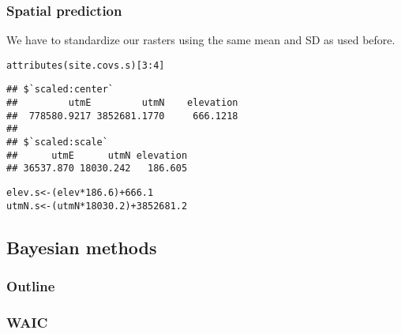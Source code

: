 \documentclass[color=usenames,dvipsnames]{beamer}\usepackage[]{graphicx}\usepackage[]{color}
\makeatletter
\newcommand{\hlnum}[1]{\textcolor[rgb]{0.69,0.494,0}{#1}}%
\newcommand{\hlopt}[1]{\textcolor[rgb]{0,0,0}{#1}}%
\newcommand{\hlstd}[1]{\textcolor[rgb]{0,0,0}{#1}}%
\newcommand{\hlkwb}[1]{\textcolor[rgb]{0,0.341,0.682}{#1}}%
\newcommand{\hlkwd}[1]{\textcolor[rgb]{0.004,0.004,0.506}{#1}}%
\newenvironment{kframe}{%
 \def\at@end@of@kframe{}%
 \ifinner\ifhmode%
  \def\at@end@of@kframe{\end{minipage}}%
  \begin{minipage}{\columnwidth}%
 \fi\fi%
 \def\FrameCommand##1{\hskip\@totalleftmargin \hskip-\fboxsep
 \colorbox{shadecolor}{##1}\hskip-\fboxsep
     \hskip-\linewidth \hskip-\@totalleftmargin \hskip\columnwidth}%
 \MakeFramed {\advance\hsize-\width
   \@totalleftmargin\z@ \linewidth\hsize
   \@setminipage}}%
 {\par\unskip\endMakeFramed%
 \at@end@of@kframe}
\newenvironment{knitrout}{}{} %
\makeatother
\begin{document}
\begin{frame}[fragile]
  \frametitle{Spatial prediction}
  We have to standardize our rasters \alert{using the same mean and SD as used before}.
\begin{knitrout}\scriptsize
{}\color{fgcolor}\begin{kframe}
\begin{alltt}
\hlkwd{attributes}\hlstd{(site.covs.s)[}\hlnum{3}\hlopt{:}\hlnum{4}\hlstd{]}
\end{alltt}
\begin{verbatim}
## $`scaled:center`
##         utmE         utmN    elevation 
##  778580.9217 3852681.1770     666.1218 
## 
## $`scaled:scale`
##      utmE      utmN elevation 
## 36537.870 18030.242   186.605
\end{verbatim}
\end{kframe}
\end{knitrout}
\pause
\vfill
\begin{knitrout}
\color{fgcolor}\begin{kframe}
\begin{alltt}
\hlstd{elev.s} \hlkwb{<-} \hlstd{(elev}\hlopt{*}\hlnum{186.6}\hlstd{)}\hlopt{+}\hlnum{666.1}
\hlstd{utmN.s} \hlkwb{<-} \hlstd{(utmN}\hlopt{*}\hlnum{18030.2}\hlstd{)}\hlopt{+}\hlnum{3852681.2}
\end{alltt}
\end{kframe}
\end{knitrout}
\end{frame}



\subsection{Bayesian methods}



\begin{frame}
  \frametitle{Outline}
  \Large
\end{frame}



\begin{frame}
  \frametitle{WAIC}
  
\end{frame}
\end{document}
